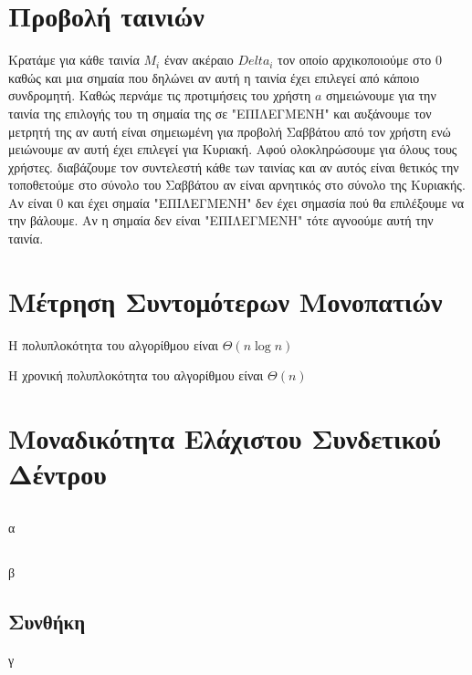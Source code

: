 \documentclass[a4paper,10pt]{article}
\begin{document}
\def\thesubsection {\alph{subsection}}
\renewcommand{\labelenumi}{\roman{enumi})}
\renewcommand{\labelenumii}{(\arabic{enumii})}



\section{Προβολή ταινιών} \setcounter{section}{1}

Κρατάμε για κάθε ταινία $M_i$ έναν ακέραιο $Delta_i$ τον οποίο αρχικοποιούμε
στο 0 καθώς και μια σημαία που δηλώνει αν αυτή η ταινία έχει επιλεγεί από
κάποιο συνδρομητή. Καθώς περνάμε τις προτιμήσεις του χρήστη $a$ σημειώνουμε
για την ταινία της επιλογής του τη σημαία της σε "ΕΠΙΛΕΓΜΕΝΗ" και αυξάνουμε
τον μετρητή της αν αυτή είναι σημειωμένη για προβολή Σαββάτου από τον χρήστη
ενώ μειώνουμε αν αυτή έχει επιλεγεί για Κυριακή. Αφού ολοκληρώσουμε για όλους
τους χρήστες. διαβάζουμε τον συντελεστή κάθε των ταινίας και αν αυτός είναι
θετικός την τοποθετούμε στο σύνολο του Σαββάτου αν είναι αρνητικός στο σύνολο
της Κυριακής. Αν είναι 0 και έχει σημαία "ΕΠΙΛΕΓΜΕΝΗ" δεν έχει σημασία πού θα
επιλέξουμε να την βάλουμε.  Αν η σημαία δεν είναι "ΕΠΙΛΕΓΜΕΝΗ" τότε αγνοούμε
αυτή την ταινία.

\section{Μέτρηση Συντομότερων Μονοπατιών}
Η πολυπλοκότητα του αλγορίθμου είναι $\Theta(n\log{n})$



Η χρονική πολυπλοκότητα του αλγορίθμου είναι $\Theta(n)$


\section{Μοναδικότητα Ελάχιστου Συνδετικού Δέντρου}
\subsection{}
α
\subsection{}
β
\subsection{Συνθήκη}
γ
\end{document}
